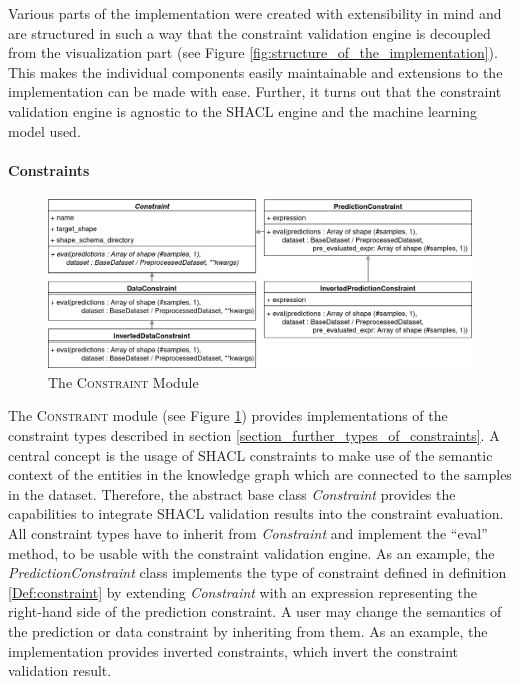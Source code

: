 Various parts of the implementation were created with extensibility in mind and are structured in such a way that the constraint validation engine is decoupled from the visualization part (see Figure \ref{fig:structure_of_the_implementation}). This makes the individual components easily maintainable and extensions to the implementation can be made with ease. Further, it turns out that the constraint validation engine is agnostic to the SHACL engine and the machine learning model used.  

\paragraph{Constraints} 
\begin{figure}
    \centering
    \includegraphics[width=\textwidth]{images/implementation/Constraint.png}
    \caption{The \textsc{Constraint} Module}
    \label{fig:the_constraint_module}
\end{figure}
The \textsc{Constraint} module (see Figure \ref{fig:the_constraint_module}) provides implementations of the constraint types described in section \ref{section_further_types_of_constraints}. A central concept is the usage of SHACL constraints to make use of the semantic context of the entities in the knowledge graph which are connected to the samples in the dataset. Therefore, the abstract base class \emph{Constraint} provides the capabilities to integrate SHACL validation results into the constraint evaluation. All constraint types have to inherit from \emph{Constraint} and implement the ``eval'' method, to be usable with the constraint validation engine. As an example, the \emph{PredictionConstraint} class implements the type of constraint defined in definition \ref{Def:constraint} by extending \emph{Constraint} with an expression representing the right-hand side of the prediction constraint. A user may change the semantics of the prediction or data constraint by inheriting from them. As an example, the implementation provides inverted constraints, which invert the constraint validation result.



